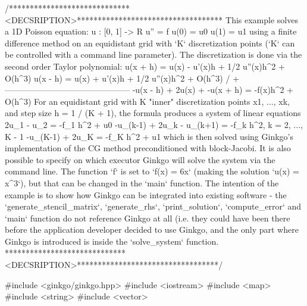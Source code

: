 \begin{DoxyCodeInclude}
\textcolor{comment}{/*****************************<DECSRIPTION>***********************************}
\textcolor{comment}{This example solves a 1D Poisson equation:}
\textcolor{comment}{}
\textcolor{comment}{    u : [0, 1] -> R}
\textcolor{comment}{    u'' = f}
\textcolor{comment}{    u(0) = u0}
\textcolor{comment}{    u(1) = u1}
\textcolor{comment}{}
\textcolor{comment}{using a finite difference method on an equidistant grid with `K` discretization}
\textcolor{comment}{points (`K` can be controlled with a command line parameter). The discretization}
\textcolor{comment}{is done via the second order Taylor polynomial:}
\textcolor{comment}{}
\textcolor{comment}{u(x + h) = u(x) - u'(x)h + 1/2 u''(x)h^2 + O(h^3)}
\textcolor{comment}{u(x - h) = u(x) + u'(x)h + 1/2 u''(x)h^2 + O(h^3)  / +}
\textcolor{comment}{---------------------------------------------}
\textcolor{comment}{-u(x - h) + 2u(x) + -u(x + h) = -f(x)h^2 + O(h^3)}
\textcolor{comment}{}
\textcolor{comment}{For an equidistant grid with K "inner" discretization points x1, ..., xk, and}
\textcolor{comment}{step size h = 1 / (K + 1), the formula produces a system of linear equations}
\textcolor{comment}{}
\textcolor{comment}{           2u\_1 - u\_2     = -f\_1 h^2 + u0}
\textcolor{comment}{-u\_(k-1) + 2u\_k - u\_(k+1) = -f\_k h^2,       k = 2, ..., K - 1}
\textcolor{comment}{-u\_(K-1) + 2u\_K           = -f\_K h^2 + u1}
\textcolor{comment}{}
\textcolor{comment}{}
\textcolor{comment}{which is then solved using Ginkgo's implementation of the CG method}
\textcolor{comment}{preconditioned with block-Jacobi. It is also possible to specify on which}
\textcolor{comment}{executor Ginkgo will solve the system via the command line.}
\textcolor{comment}{The function `f` is set to `f(x) = 6x` (making the solution `u(x) = x^3`), but}
\textcolor{comment}{that can be changed in the `main` function.}
\textcolor{comment}{}
\textcolor{comment}{The intention of the example is to show how Ginkgo can be integrated into}
\textcolor{comment}{existing software - the `generate\_stencil\_matrix`, `generate\_rhs`,}
\textcolor{comment}{`print\_solution`, `compute\_error` and `main` function do not reference Ginkgo at}
\textcolor{comment}{all (i.e. they could have been there before the application developer decided to}
\textcolor{comment}{use Ginkgo, and the only part where Ginkgo is introduced is inside the}
\textcolor{comment}{`solve\_system` function.}
\textcolor{comment}{*****************************<DECSRIPTION>**********************************/}

\textcolor{preprocessor}{#include <ginkgo/ginkgo.hpp>}
\textcolor{preprocessor}{#include <iostream>}
\textcolor{preprocessor}{#include <map>}
\textcolor{preprocessor}{#include <string>}
\textcolor{preprocessor}{#include <vector>}



\end{DoxyCodeInclude}
